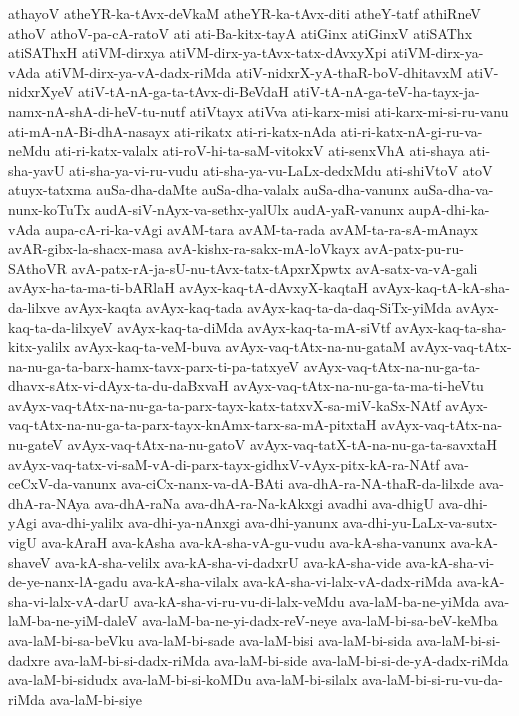 {athayoV
atheYR-ka-tAvx-deVkaM
atheYR-ka-tAvx-diti
atheY-tatf
athiRneV
athoV
athoV-pa-cA-ratoV
ati
ati-Ba-kitx-tayA
atiGinx
atiGinxV
atiSAThx
atiSAThxH
atiVM-dirxya
atiVM-dirx-ya-tAvx-tatx-dAvxyXpi
atiVM-dirx-ya-vAda
atiVM-dirx-ya-vA-dadx-riMda
atiV-nidxrX-yA-thaR-boV-dhitavxM
atiV-nidxrXyeV
atiV-tA-nA-ga-ta-tAvx-di-BeVdaH
atiV-tA-nA-ga-teV-ha-tayx-ja-namx-nA-shA-di-heV-tu-nutf
atiVtayx
atiVva
ati-karx-misi
ati-karx-mi-si-ru-vanu
ati-mA-nA-Bi-dhA-nasayx
ati-rikatx
ati-ri-katx-nAda
ati-ri-katx-nA-gi-ru-va-neMdu
ati-ri-katx-valalx
ati-roV-hi-ta-saM-vitokxV
ati-senxVhA
ati-shaya
ati-sha-yavU
ati-sha-ya-vi-ru-vudu
ati-sha-ya-vu-LaLx-dedxMdu
ati-shiVtoV
atoV
atuyx-tatxma
auSa-dha-daMte
auSa-dha-valalx
auSa-dha-vanunx
auSa-dha-va-nunx-koTuTx
audA-siV-nAyx-va-sethx-yalUlx
audA-yaR-vanunx
aupA-dhi-ka-vAda
aupa-cA-ri-ka-vAgi
avAM-tara
avAM-ta-rada
avAM-ta-ra-sA-mAnayx
avAR-gibx-la-shacx-masa
avA-kishx-ra-sakx-mA-loVkayx
avA-patx-pu-ru-SAthoVR
avA-patx-rA-ja-sU-nu-tAvx-tatx-tApxrXpwtx
avA-satx-va-vA-gali
avAyx-ha-ta-ma-ti-bARlaH
avAyx-kaq-tA-dAvxyX-kaqtaH
avAyx-kaq-tA-kA-sha-da-lilxve
avAyx-kaqta
avAyx-kaq-tada
avAyx-kaq-ta-da-daq-SiTx-yiMda
avAyx-kaq-ta-da-lilxyeV
avAyx-kaq-ta-diMda
avAyx-kaq-ta-mA-siVtf
avAyx-kaq-ta-sha-kitx-yalilx
avAyx-kaq-ta-veM-buva
avAyx-vaq-tAtx-na-nu-gataM
avAyx-vaq-tAtx-na-nu-ga-ta-barx-hamx-tavx-parx-ti-pa-tatxyeV
avAyx-vaq-tAtx-na-nu-ga-ta-dhavx-sAtx-vi-dAyx-ta-du-daBxvaH
avAyx-vaq-tAtx-na-nu-ga-ta-ma-ti-heVtu
avAyx-vaq-tAtx-na-nu-ga-ta-parx-tayx-katx-tatxvX-sa-miV-kaSx-NAtf
avAyx-vaq-tAtx-na-nu-ga-ta-parx-tayx-knAmx-tarx-sa-mA-pitxtaH
avAyx-vaq-tAtx-na-nu-gateV
avAyx-vaq-tAtx-na-nu-gatoV
avAyx-vaq-tatX-tA-na-nu-ga-ta-savxtaH
avAyx-vaq-tatx-vi-saM-vA-di-parx-tayx-gidhxV-vAyx-pitx-kA-ra-NAtf
ava-ceCxV-da-vanunx
ava-ciCx-nanx-va-dA-BAti
ava-dhA-ra-NA-thaR-da-lilxde
ava-dhA-ra-NAya
ava-dhA-raNa
ava-dhA-ra-Na-kAkxgi
avadhi
ava-dhigU
ava-dhi-yAgi
ava-dhi-yalilx
ava-dhi-ya-nAnxgi
ava-dhi-yanunx
ava-dhi-yu-LaLx-va-sutx-vigU
ava-kAraH
ava-kAsha
ava-kA-sha-vA-gu-vudu
ava-kA-sha-vanunx
ava-kA-shaveV
ava-kA-sha-velilx
ava-kA-sha-vi-dadxrU
ava-kA-sha-vide
ava-kA-sha-vi-de-ye-nanx-lA-gadu
ava-kA-sha-vilalx
ava-kA-sha-vi-lalx-vA-dadx-riMda
ava-kA-sha-vi-lalx-vA-darU
ava-kA-sha-vi-ru-vu-di-lalx-veMdu
ava-laM-ba-ne-yiMda
ava-laM-ba-ne-yiM-daleV
ava-laM-ba-ne-yi-dadx-reV-neye
ava-laM-bi-sa-beV-keMba
ava-laM-bi-sa-beVku
ava-laM-bi-sade
ava-laM-bisi
ava-laM-bi-sida
ava-laM-bi-si-dadxre
ava-laM-bi-si-dadx-riMda
ava-laM-bi-side
ava-laM-bi-si-de-yA-dadx-riMda
ava-laM-bi-sidudx
ava-laM-bi-si-koMDu
ava-laM-bi-silalx
ava-laM-bi-si-ru-vu-da-riMda
ava-laM-bi-siye
}
